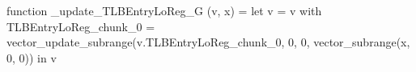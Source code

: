 function _update_TLBEntryLoReg_G (v, x) = let v = { v with TLBEntryLoReg_chunk_0 = vector_update_subrange(v.TLBEntryLoReg_chunk_0, 0, 0, vector_subrange(x, 0, 0)) } in v
